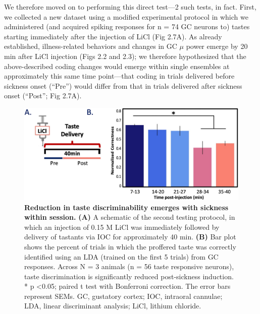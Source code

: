 \begin{refsection}
We therefore moved on to performing this direct test—2 such tests, in fact. First, we collected a new dataset using a modified experimental protocol in which we administered (and acquired spiking responses for n = 74 GC neurons to) tastes starting immediately after the injection of LiCl (Fig 2.7A). As already established, illness-related behaviors and changes in GC \(\mu\) power emerge by 20 min after LiCl injection (Figs 2.2 and 2.3); we therefore hypothesized that the above-described coding changes would emerge within single ensembles at approximately this same time point—that coding in trials delivered before sickness onset (“Pre”) would differ from that in trials delivered after sickness onset (“Post”; Fig 2.7A).

\begin{figure}
\includegraphics[width=\linewidth]{stone_2022_figs/journal.pbio.3001537.g007.png} 
\caption{\textbf{Reduction in taste discriminability emerges with sickness within session.} \textbf{(A)} A schematic of the second testing protocol, in which an injection of 0.15 M LiCl was immediately followed by delivery of tastants via IOC for approximately 40 min. \textbf{(B)} Bar plot shows the percent of trials in which the proffered taste was correctly identified using an LDA (trained on the first 5 trials) from GC responses. Across N = 3 animals (n = 56 taste responsive neurons), taste discrimination is significantly reduced post-sickness induction. * p \textless 0.05; paired t test with Bonferroni correction. The error bars represent SEMs. GC, gustatory cortex; IOC, intraoral cannulae; LDA, linear discriminant analysis; LiCl, lithium chloride.
}
\label{fig:wrapfig}
\end{figure}



\end{refsection}
